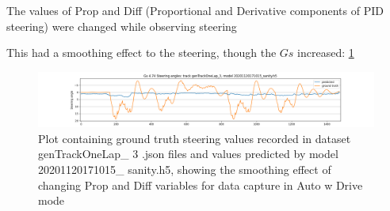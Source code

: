 The values of Prop and Diff (Proportional and Derivative components of PID steering) were changed while observing steering 

This had a smoothing effect to the steering, though the $Gs$ increased:
 \ref{fig:genTrackOneLap_3_20201120171015_sanity_gos} 
 
\begin{figure}[ht]
 \centering 
 \includegraphics[width=\textwidth]{Figures/sa_genTrackOneLap_3_20201120171015_sanity.h5.png}
 \caption{Plot containing ground truth steering values recorded in dataset genTrackOneLap\_ 3 .json files and values predicted by model 20201120171015\_ sanity.h5, showing the smoothing effect of changing Prop and Diff variables for data capture in Auto w Drive mode}
 \label{fig:genTrackOneLap_3_20201120171015_sanity_gos} 
\end{figure}